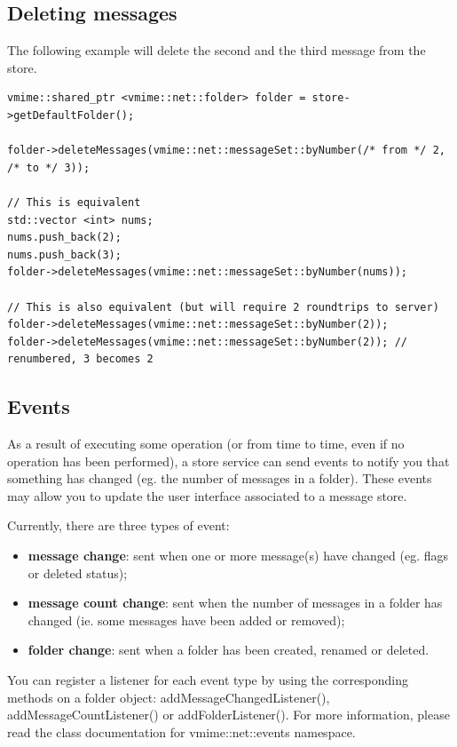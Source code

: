 \subsection{Deleting messages} %

The following example will delete the second and the third message from the
store.

\begin{lstlisting}[caption={Deleting messages}]
vmime::shared_ptr <vmime::net::folder> folder = store->getDefaultFolder();

folder->deleteMessages(vmime::net::messageSet::byNumber(/* from */ 2, /* to */ 3));

// This is equivalent
std::vector <int> nums;
nums.push_back(2);
nums.push_back(3);
folder->deleteMessages(vmime::net::messageSet::byNumber(nums));

// This is also equivalent (but will require 2 roundtrips to server)
folder->deleteMessages(vmime::net::messageSet::byNumber(2));
folder->deleteMessages(vmime::net::messageSet::byNumber(2)); // renumbered, 3 becomes 2
\end{lstlisting}

\subsection{Events} %

As a result of executing some operation (or from time to time, even if no
operation has been performed), a store service can send events to notify you
that something has changed (eg. the number of messages in a folder). These
events may allow you to update the user interface associated to a message
store.

Currently, there are three types of event:

\begin{itemize}
\item {\bf message change}: sent when one or more message(s) have
changed (eg. flags or deleted status);
\item {\bf message count change}: sent when the number of messages in a folder
has changed (ie. some messages have been added or removed);
\item {\bf folder change}: sent when a folder has been created, renamed or
deleted.
\end{itemize}

You can register a listener for each event type by using the corresponding
methods on a {\vcode folder} object: {\vcode addMessageChangedListener()},
{\vcode addMessageCountListener()} or {\vcode addFolderListener()}. For more
information, please read the class documentation for
{\vcode vmime::net::events} namespace.

